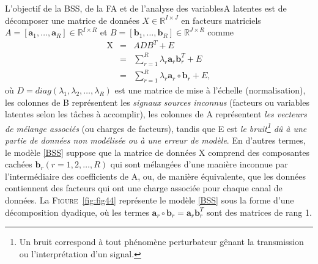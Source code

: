 \documentclass[11pt,a4paper,oneside]{book}
\def\R{\mathbb R}
\def\a{\mathbf a}
\def\b{\mathbf b}
\newcommand{\figref}[1]{\textsc{Figure}~\ref{#1}}
\begin{document}
 L'objectif de la BSS, de la FA et de l'analyse des variablesA latentes est de décomposer une matrice de données $ X\in\R^{I\times J} $ en  facteurs matriciels $ A=\left[\a_{1},\dots,\a_{R}\right]\in\R^{I\times R} $ et $ B=[\b_{1},\dots,\b_{R}]\in\R^{J\times R} $ comme
\begin{eqnarray}
\mathrm{X}&=&ADB^{T}+E\nonumber\\
&=&\sum_{r=1}^{R}\lambda_{r}\a_{r}\b_{r}^{T}+E\nonumber\\
&=&\sum_{r=1}^{R}\lambda_{r}\a_{r}\circ\b_{r}+E,\label{BSS}
\end{eqnarray}
 où $ D= diag(\lambda_{1},\lambda_{2},\dots,\lambda_{R}) $ est une matrice de mise à l'échelle (normalisation), les colonnes de B représentent les \textit{signaux sources inconnus} (facteurs ou variables latentes selon les tâches à accomplir), les colonnes de A représentent \textit{les vecteurs de mélange associés} (ou charges de facteurs), tandis que E est \textit{le bruit\footnote{Un bruit correspond à tout phénomène perturbateur gênant
 		la transmission ou l'interprétation d'un signal.} dû à une partie de données non modélisée ou à une erreur de modèle}. En d'autres termes, le modèle \eqref{BSS} suppose que la matrice de données $ \mathrm{X} $ comprend des composantes cachées $ \b_{r}(r=1,2,\dots,R) $ qui sont mélangées d'une manière inconnue par l'intermédiaire des coefficients de A, ou, de manière équivalente, que les données contiennent des facteurs qui ont une charge associée pour chaque canal de données. La \figref{fig:fig44} représente le modèle \eqref{BSS} sous la forme d'une décomposition dyadique, où les termes $ \a_{r}\circ\b_{r}=\a_{r}\b_{r}^{T} $ sont des matrices de rang 1.
\end{document}
